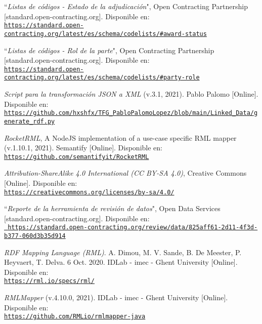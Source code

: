 \begin{thebibliography}{X}
            ``\textit{Listas de códigos - Estado de la adjudicación}", Open Contracting Partnership [standard.open-contracting.org]. Disponible en:
            \\ \texttt{\url{https://standard.open-contracting.org/latest/es/schema/codelists/\#award-status}}
            
             ``\textit{Listas de códigos - Rol de la parte}", Open Contracting Partnership [standard.open-contracting.org]. Disponible en:
            \\ \texttt{\url{https://standard.open-contracting.org/latest/es/schema/codelists/\#party-role}}
        
           \textit{Script para la transformación JSON a XML} (v.3.1, 2021). Pablo Palomo [Online]. Disponible en:
            \\ \texttt{\url{https://github.com/hxshfx/TFG_PabloPalomoLopez/blob/main/Linked_Data/generate_rdf.py}}
        
            \textit{RocketRML}, A NodeJS implementation of a use-case specific RML mapper (v.1.10.1, 2021). Semantify [Online]. Disponible en:    
            \\ \texttt{\url{https://github.com/semantifyit/RocketRML}}
            
            \textit{Attribution-ShareAlike 4.0 International (CC BY-SA 4.0)}, Creative Commons [Online]. Disponible en:      
            \\ \texttt{\url{https://creativecommons.org/licenses/by-sa/4.0/}}
            
            ``\textit{Reporte de la herramienta de revisión de datos}", Open Data Services [standard.open-contracting.org]. Disponible en:
            \\ \texttt{\url{ https://standard.open-contracting.org/review/data/825aff61-2d11-4f3d-b377-060d3b35d914}}
            
            \textit{RDF Mapping Language (RML)}. A. Dimou, M. V. Sande, B. De Meester, P. Heyvaert, T. Delva. 6 Oct. 2020. IDLab - imec - Ghent University [Online]. Disponible en:
            \\ \texttt{\url{https://rml.io/specs/rml/}}
            
            \textit{RMLMapper} (v.4.10.0, 2021). IDLab - imec - Ghent University [Online]. Disponible en:  
            \\ \texttt{\url{https://github.com/RMLio/rmlmapper-java}}
            

\end{thebibliography}
